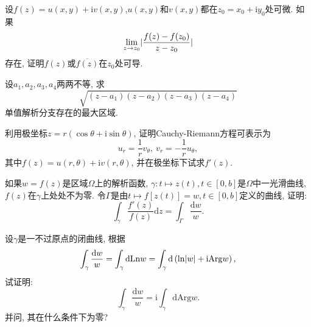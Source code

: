 \begin{yyEx}
    设$f(z) = u(x,y)+\mathrm{i}v(x,y)$,$u(x,y)$和$v(x,y)$都在$z_0=x_0+\mathrm{i}y_0$处可微. 如果
    \begin{equation*}
        \lim_{z\to z_0}\lvert\frac{f(z)-f(z_0)}{z-z_0}\rvert
    \end{equation*}
    存在, 证明$f(z)$或$\overline{f(z)}$在$z_0$处可导.
\end{yyEx}

\begin{yyEx}
    设$a_1,a_2,a_3,a_4$两两不等, 求
    \begin{equation*}
        \sqrt{(z-a_1)(z-a_2)(z-a_3)(z-a_4)}
    \end{equation*}
    单值解析分支存在的最大区域.
\end{yyEx}

\begin{yyEx}
    利用极坐标$z = r(\cos\theta+\mathrm{i}\sin\theta)$, 证明Cauchy-Riemann方程可表示为
    \begin{equation*}
        u_r = \frac{1}{r}v_\theta,~    v_r = -\frac{1}{r}u_\theta,
    \end{equation*}
    其中$f(z) = u(r,\theta)+\mathrm{i}v(r,\theta)$, 并在极坐标下试求$f'(z)$.
\end{yyEx}

\begin{yyEx}
    如果$w =f(z)$是区域$\Omega$上的解析函数, $\gamma:t\mapsto z(t),t\in[0,b]$是$\Omega$中一光滑曲线, $f(z)$在$\gamma$上处处不为零. 令$\Gamma$是由$t\mapsto f[z(t)] =w,t\in[0,b]$定义的曲线, 证明:
    \begin{equation*}
        \int_{\gamma}\frac{f'(z)}{f(z)}\mathrm{d}z = \int_{\Gamma}\frac{\mathrm{d}w}{w}.
    \end{equation*}
\end{yyEx}

\begin{yyEx}
    设$\gamma$是一不过原点的闭曲线, 根据
    \begin{equation*}
        \int_{\gamma}\frac{\mathrm{d}w}{w} = \int_{\gamma}\mathrm{d}\mathrm{Ln}w = \int_{\gamma}\mathrm{d}\left(
        \ln\lvert w\rvert+\mathrm{i}\mathrm{Arg}w
        \right),
    \end{equation*}
    试证明:
    \begin{equation*}
        \int_{\gamma}\frac{\mathrm{d}w}{w} = \mathrm{i}\int_{\gamma}\mathrm{d}\mathrm{Arg}w.
    \end{equation*}
    并问, 其在什么条件下为零?
\end{yyEx}

